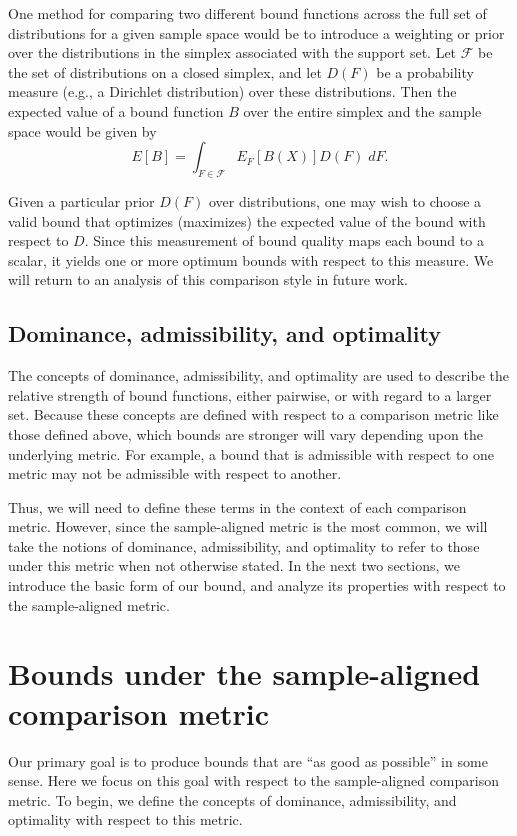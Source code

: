 \documentclass{article}
\theoremstyle{definition}
\theoremstyle{remark}
\begin{document}
One method for comparing two different bound functions across the full set of distributions for a given sample space would be to introduce a weighting or prior over the distributions in the simplex associated with the support set. Let $\mathcal{F}$ be the set of distributions on a closed simplex, and let $D(F)$ be a probability measure (e.g., a Dirichlet distribution) over these distributions. Then the expected value of a bound function $B$ over the entire simplex and the sample space would be given by
$$
E[B]=\int_{F\in\mathcal{F}} E_F[B(X)] D(F) \; dF.
$$

Given a particular prior $D(F)$ over distributions, one may wish to choose a valid bound that optimizes (maximizes) the expected value of the bound with respect to $D$.  Since this measurement of bound quality maps each bound to a scalar, it yields one or more optimum bounds with respect to this measure. We will return to an analysis of this comparison style in future work.

\subsection{Dominance, admissibility, and optimality}
The concepts of dominance, admissibility, and optimality are used to describe the relative strength of bound functions, either pairwise, or with regard to a larger set.  Because these concepts are defined with respect to a comparison metric like those defined above, which bounds are stronger will vary depending upon the underlying metric. For example, a bound that is admissible with respect to one metric may not be admissible with respect to another.

Thus, we will need to define these terms in the context of each comparison metric. However, since the sample-aligned metric is the most common, we will take the notions of dominance, admissibility, and optimality to refer to those under this metric when not otherwise stated.
In the next two sections, we introduce the basic form of our bound, and analyze its properties with respect to the sample-aligned metric.

\section{Bounds under the sample-aligned comparison metric}
\label{sec:sample_aligned_comp}
Our primary goal is to produce bounds that are ``as good as possible'' in some sense. Here we focus on this goal with respect to the sample-aligned comparison metric. 
To begin, we define the concepts of dominance, admissibility, and optimality with respect to this metric.
\end{document}
